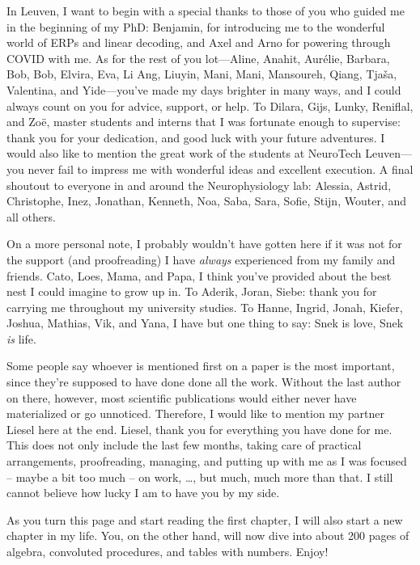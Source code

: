In Leuven, I want to begin with a special thanks to those of you who
guided me in the beginning of my PhD: Benjamin, for introducing me to
the wonderful world of ERPs and linear decoding, and Axel and Arno for
powering through COVID with me. As for the rest of you lot—Aline,
Anahit, Aurélie, Barbara, Bob, Bob, Elvira, Eva, Li Ang, Liuyin, Mani,
Mani, Mansoureh, Qiang, Tjaša, Valentina, and Yide—you've made my days
brighter in many ways, and I could always count on you for advice,
support, or help. To Dilara, Gijs, Lunky, Reniflal, and Zoë, master
students and interns that I was fortunate enough to supervise: thank
you for your dedication, and good luck with your future adventures. I
would also like to mention the great work of the students at NeuroTech
Leuven—you never fail to impress me with wonderful ideas and excellent
execution. A final shoutout to everyone in and around the
Neurophysiology lab: Alessia, Astrid, Christophe, Inez, Jonathan,
Kenneth, Noa, Saba, Sara, Sofie, Stijn, Wouter, and all others.

On a more personal note, I probably wouldn't have gotten here if it was
not for the support (and proofreading) I have \emph{always} experienced
from my family and friends.
Cato, Loes, Mama, and Papa, I think you've provided about the
best nest I could imagine to grow up in. To Aderik, Joran, Siebe: thank you for
carrying me throughout my university studies.
To Hanne, Ingrid, Jonah, Kiefer, Joshua, Mathias, Vik, and Yana, I have but one
thing to say: Snek is love, Snek \emph{is} life.

Some people say whoever is mentioned first on a paper is the most
important, since they're supposed to have done done all the work.
Without the last author on there, however, most scientific publications would
either never have materialized or go unnoticed. Therefore, I would like to
mention my partner Liesel here at the end.
Liesel, thank you for everything you have done
for me. This does not only include the last few months, taking care of
practical arrangements, proofreading, managing, and putting up with me as I was
focused -- maybe a bit too much -- on work, \ldots, but much, much more than
that.
I still cannot believe how lucky I am to have you by my side.

As you turn this page and start reading the first chapter, I will also
start a new chapter in my life. You, on the other hand, will now dive
into about 200 pages of algebra, convoluted procedures, and tables with
numbers. Enjoy!
